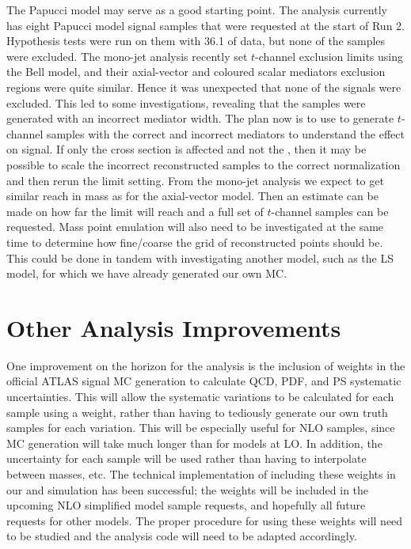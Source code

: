 The Papucci model may serve as a good starting point. The \monoZ analysis currently has eight Papucci model signal samples that were requested at the start of Run 2. Hypothesis tests were run on them with 36.1 \ifb of data, but none of the samples were excluded. The mono-jet analysis recently set $t$-channel exclusion limits using the Bell model, and their axial-vector and coloured scalar mediators exclusion regions were quite similar. Hence it was unexpected that none of the \monoZ signals were excluded. This led to some investigations, revealing that the \monoZ samples were generated with an incorrect mediator width. The plan now is to use \madgraph to generate $t$-channel samples with the correct and incorrect mediators to understand the effect on signal. If only the cross section is affected and not the \etmiss, then it may be possible to scale the incorrect reconstructed samples to the correct normalization and then rerun the limit setting. From the mono-jet analysis we expect to get similar reach in mass as for the axial-vector model. Then an estimate can be made on how far the limit will reach and a full set of $t$-channel samples can be requested. Mass point emulation will also need to be investigated at the same time to determine how fine/coarse the grid of reconstructed points should be. This could be done in tandem with investigating another model, such as the LS model, for which we have already generated our own MC.

\section{Other Analysis Improvements}

One improvement on the horizon for the analysis is the inclusion of weights in the official ATLAS signal MC generation to calculate QCD, PDF, and PS systematic uncertainties. This will allow the systematic variations to be calculated for each sample using a weight, rather than having to tediously generate our own truth samples for each variation. This will be especially useful for NLO samples, since MC generation will take much longer than for models at LO. In addition, the uncertainty for each sample will be used rather than having to interpolate between masses, etc. The technical implementation of including these weights in our \madgraph and \pythia simulation has been successful; the weights will be included in the upcoming NLO simplified model sample requests, and hopefully all future requests for other models. The proper procedure for using these weights will need to be studied and the analysis code will need to be adapted accordingly.

